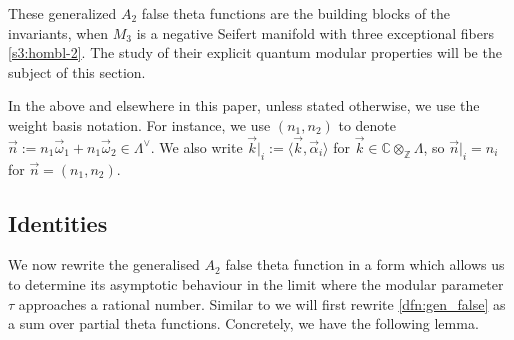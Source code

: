 \documentclass[pdftex]{sigma}
\newcommand{\CC}{\mathbb{C}}
\newcommand{\ZZ}{\mathbb{Z}}
\def\bv{{\vec{\underline{b}}}}
\theoremstyle{definition}
\numberwithin{equation}{section}
\begin{document}
These generalized $A_2$ false theta functions are the building blocks of the \smash{$\widehat Z^{{\rm SU}(3)}_\bv(M_3)$} invariants, when $M_3$ is a negative Seifert manifold with three exceptional fibers \eqref{s3:hombl-2}. The study of their explicit quantum modular properties will be the subject of this section.


In the above and elsewhere in this paper, unless stated otherwise, we use the weight basis notation. For instance, we use $(n_1, n_2)$ to denote $\vec n := n_1\vec \omega_1 + n_1\vec \omega_2 \in \Lambda^\vee$. We also write $\vec k\lvert_i := \langle \vec k, \vec \alpha_i\rangle$ for $\vec k\in \CC\otimes_{\ZZ}\Lambda$, so $\vec n\lvert_i =n_i$ for $\vec n=(n_1,n_2)$.



\subsection{Identities}
\label{subsec:defns}

We now rewrite the generalised $A_2$ false theta function in a form which allows us to determine its asymptotic behaviour in the limit where the modular parameter $\tau$ approaches a rational number. Similar to \cite{bringmann2018higher} we will first rewrite \eqref{dfn:gen_false} as a sum over partial theta functions. Concretely, we have the following lemma.
\end{document}
